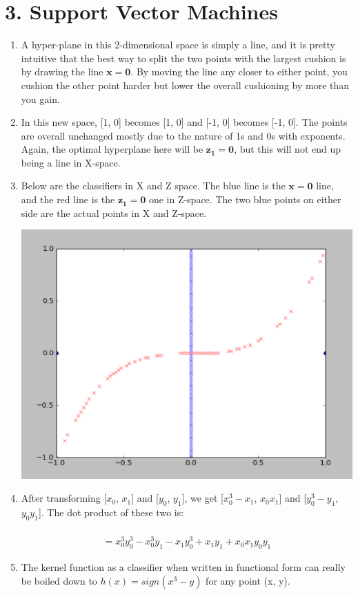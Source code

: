 \documentclass[12pt]{article}
\begin{document}
\section*{3. Support Vector Machines}
\begin{enumerate}[label=(\alph*)]
	\item A hyper-plane in this 2-dimensional space is simply a line, and it is pretty intuitive that the best way to split the two points with the largest cushion is by drawing the line $\boldsymbol{x = 0}$. By moving the line any closer to either point, you cushion the other point harder but lower the overall cushioning by more than you gain.
	\item In this new space, [1, 0] becomes [1, 0] and [-1, 0] becomes [-1, 0]. The points are overall unchanged mostly due to the nature of 1s and 0s with exponents. Again, the optimal hyperplane here will be $\boldsymbol{z_1 = 0}$, but this will not end up being a line in X-space.
	\item Below are the classifiers in X and Z space. The blue line is the $\boldsymbol{x = 0}$ line, and the red line is the $\boldsymbol{z_1 = 0}$ one in Z-space. The two blue points on either side are the actual points in X and Z-space.
	
	\includegraphics[scale=0.6]{3a.png}
	
	\item After transforming [$x_0$, $x_1$] and [$y_0$, $y_1$], we get [$x_0^3 - x_1$, $x_0x_1$] and [$y_0^3 - y_1$, $y_0y_1$]. The dot product of these two is:
	
	\begin{gather*}
		[(x_0^3 - x_1)(y_0^3 - y_1), x_0x_1y_0y_1]
		\\ = x_0^3y_0^3 - x_0^3y_1 - x_1y_0^3 + x_1y_1 + x_0x_1y_0y_1
	\end{gather*}
	\item The kernel function as a classifier when written in functional form can really be boiled down to $h(x) = sign(x^3 - y)$ for any point (x, y).
\end{enumerate}
\end{document}
